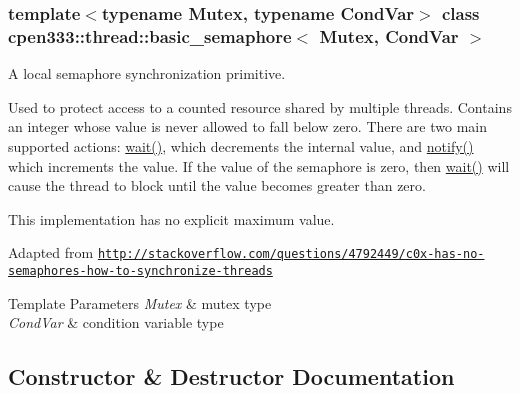 \subsubsection*{template$<$typename Mutex, typename Cond\+Var$>$\newline
class cpen333\+::thread\+::basic\+\_\+semaphore$<$ Mutex, Cond\+Var $>$}

A local semaphore synchronization primitive. 

Used to protect access to a counted resource shared by multiple threads. Contains an integer whose value is never allowed to fall below zero. There are two main supported actions\+: \hyperlink{classcpen333_1_1thread_1_1basic__semaphore_ac5cacef970643d393429ff87c0c6d6bf}{wait()}, which decrements the internal value, and \hyperlink{classcpen333_1_1thread_1_1basic__semaphore_a0b5032fc8df915cb51276411b1153b84}{notify()} which increments the value. If the value of the semaphore is zero, then \hyperlink{classcpen333_1_1thread_1_1basic__semaphore_ac5cacef970643d393429ff87c0c6d6bf}{wait()} will cause the thread to block until the value becomes greater than zero.

This implementation has no explicit maximum value.

Adapted from \href{http://stackoverflow.com/questions/4792449/c0x-has-no-semaphores-how-to-synchronize-threads}{\tt http\+://stackoverflow.\+com/questions/4792449/c0x-\/has-\/no-\/semaphores-\/how-\/to-\/synchronize-\/threads}


\begin{DoxyTemplParams}{Template Parameters}
{\em Mutex} & mutex type \\
\hline
{\em Cond\+Var} & condition variable type \\
\hline
\end{DoxyTemplParams}


\subsection{Constructor \& Destructor Documentation}
\mbox{\label{classcpen333_1_1thread_1_1basic__semaphore_adfcd90a6776f9bdbb580bff6d9fa2a3e}} 
